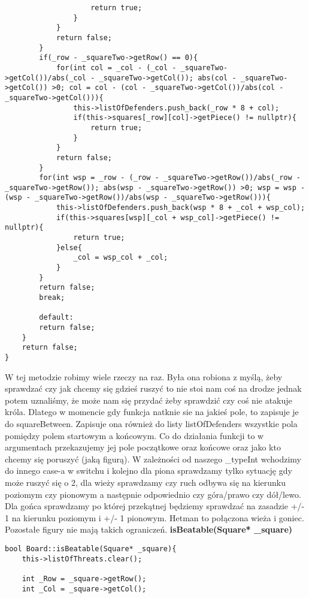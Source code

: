 \documentclass[]{report}
\begin{document}
\begin{flushleft}
\begin{lstlisting}
					return true;
				}
			}
			return false;
		}
		if(_row - _squareTwo->getRow() == 0){
			for(int col = _col - (_col - _squareTwo->getCol())/abs(_col - _squareTwo->getCol()); abs(col - _squareTwo->getCol()) >0; col = col - (col - _squareTwo->getCol())/abs(col - _squareTwo->getCol())){
				this->listOfDefenders.push_back(_row * 8 + col);
				if(this->squares[_row][col]->getPiece() != nullptr){
					return true;
				}
			}
			return false;
		}
		for(int wsp = _row - (_row - _squareTwo->getRow())/abs(_row - _squareTwo->getRow()); abs(wsp - _squareTwo->getRow()) >0; wsp = wsp - (wsp - _squareTwo->getRow())/abs(wsp - _squareTwo->getRow())){
			this->listOfDefenders.push_back(wsp * 8 + _col + wsp_col);
			if(this->squares[wsp][_col + wsp_col]->getPiece() != nullptr){
				return true;
			}else{
				_col = wsp_col + _col;
			}
		}
		return false;
		break;
		
		default:
		return false;
	}
	return false;
}

\end{lstlisting}
\vspace{\baselineskip}
W tej metodzie robimy wiele rzeczy na raz. Była ona robiona z myślą, żeby sprawdzać czy jak chcemy się gdzieś ruszyć to nie stoi nam coś na drodze jednak potem uznaliśmy, że może nam się przydać żeby sprawdzić czy coś nie atakuje króla. Dlatego w momencie gdy funkcja natknie sie na jakieś pole, to zapisuje je do squareBetween. Zapisuje ona również do listy listOfDefenders wszystkie pola pomiędzy polem startowym a końcowym. Co do działania funkcji to w argumentach przekazujemy jej pole początkowe oraz końcowe oraz jako kto chcemy się poruszyć (jaką figurą). W zależności od naszego \_typeInt wchodzimy do innego case-a w switchu i kolejno dla piona sprawdzamy tylko sytuację gdy może ruszyć się o 2, dla wieży sprawdzamy czy ruch odbywa się na kierunku poziomym czy pionowym a następnie odpowiednio czy góra/prawo czy dół/lewo. Dla gońca sprawdzamy po której przekątnej będziemy sprawdzać na zasadzie +/- 1 na kierunku poziomym i +/- 1 pionowym. Hetman to połączona wieża i goniec. Pozostałe figury nie mają takich ograniczeń.
\vspace{\baselineskip}
\newline
\textbf{isBeatable(Square* \_square)}

\begin{lstlisting}
bool Board::isBeatable(Square* _square){
	this->listOfThreats.clear();
	
	int _Row = _square->getRow();
	int _Col = _square->getCol();
	

\end{lstlisting}
\end{flushleft}
\end{document}
